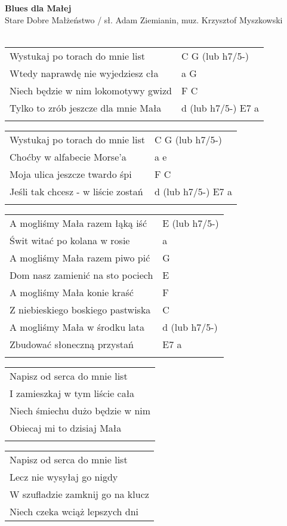 \documentclass[a5paper]{article}
\begin{document}


\noindent
\fontsize{12pt}{15pt}\selectfont
\textbf{Blues dla Małej} \\
\fontsize{8pt}{10pt}\selectfont
Stare Dobre Małżeństwo / sł. Adam Ziemianin, muz. Krzysztof Myszkowski \\ \\
\fontsize{10pt}{12pt}\selectfont
{}
\begin{tabular}{@{}p{8.5cm}p{3cm}@{}}
\noindent
Wystukaj po torach do mnie list & C G (lub h7/5-) \\
Wtedy naprawdę nie wyjedziesz cła & a G \\
Niech będzie w nim lokomotywy gwizd & F C \\
Tylko to zrób jeszcze dla mnie Mała & d (lub h7/5-) E7 a \\ \\
\end{tabular}

\noindent
\begin{tabular}{@{}p{8.5cm}p{3cm}@{}}
Wystukaj po torach do mnie list & C G (lub h7/5-)\\
Choćby w alfabecie Morse'a & a e \\
Moja ulica jeszcze twardo śpi & F C \\
Jeśli tak chcesz - w liście zostań & d (lub h7/5-) E7 a \\ \\
\end{tabular}

\noindent
\begin{tabular}{@{}p{7.5cm}p{3cm}@{}}
A mogliśmy Mała razem łąką iść & E (lub h7/5-)\\
Świt witać po kolana w rosie & a \\
A mogliśmy Mała razem piwo pić & G \\
Dom nasz zamienić na sto pociech & E \\
A mogliśmy Mała konie kraść & F \\
Z niebieskiego boskiego pastwiska & C \\
A mogliśmy Mała w środku lata & d (lub h7/5-)\\
Zbudować słoneczną przystań & E7 a \\ \\
\end{tabular}

\noindent
\begin{tabular}{@{}p{9.5cm}@{}}
Napisz od serca do mnie list \\
I zamieszkaj w tym liście cała \\
Niech śmiechu dużo będzie w nim \\
Obiecaj mi to dzisiaj Mała \\ \\
\end{tabular}

\noindent
\begin{tabular}{@{}p{9.5cm}@{}}
Napisz od serca do mnie list \\
Lecz nie wysyłaj go nigdy \\
W szufladzie zamknij go na klucz \\
Niech czeka wciąż lepszych dni
\end{tabular}
\end{document}
